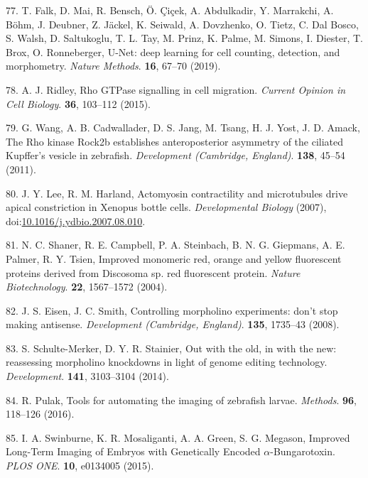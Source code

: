 \documentclass[11pt,singlespacinge,twoside]{reedthesis} %
\theoremstyle{definition}
\theoremstyle{definition}
\theoremstyle{definition}
\theoremstyle{remark}
\begin{document}
\leavevmode\hypertarget{ref-Falk2019}{}%
77. T. Falk, D. Mai, R. Bensch, Ö. Çiçek, A. Abdulkadir, Y. Marrakchi, A. Böhm, J. Deubner, Z. Jäckel, K. Seiwald, A. Dovzhenko, O. Tietz, C. Dal Bosco, S. Walsh, D. Saltukoglu, T. L. Tay, M. Prinz, K. Palme, M. Simons, I. Diester, T. Brox, O. Ronneberger, U-Net: deep learning for cell counting, detection, and morphometry. \emph{Nature Methods}. \textbf{16}, 67--70 (2019).

\leavevmode\hypertarget{ref-Ridley2015}{}%
78. A. J. Ridley, Rho GTPase signalling in cell migration. \emph{Current Opinion in Cell Biology}. \textbf{36}, 103--112 (2015).

\leavevmode\hypertarget{ref-Wang2011}{}%
79. G. Wang, A. B. Cadwallader, D. S. Jang, M. Tsang, H. J. Yost, J. D. Amack, The Rho kinase Rock2b establishes anteroposterior asymmetry of the ciliated Kupffer's vesicle in zebrafish. \emph{Development (Cambridge, England)}. \textbf{138}, 45--54 (2011).

\leavevmode\hypertarget{ref-Lee2007a}{}%
80. J. Y. Lee, R. M. Harland, Actomyosin contractility and microtubules drive apical constriction in Xenopus bottle cells. \emph{Developmental Biology} (2007), doi:\href{https://doi.org/10.1016/j.ydbio.2007.08.010}{10.1016/j.ydbio.2007.08.010}.

\leavevmode\hypertarget{ref-Shaner2004}{}%
81. N. C. Shaner, R. E. Campbell, P. A. Steinbach, B. N. G. Giepmans, A. E. Palmer, R. Y. Tsien, Improved monomeric red, orange and yellow fluorescent proteins derived from Discosoma sp. red fluorescent protein. \emph{Nature Biotechnology}. \textbf{22}, 1567--1572 (2004).

\leavevmode\hypertarget{ref-Eisen2008b}{}%
82. J. S. Eisen, J. C. Smith, Controlling morpholino experiments: don't stop making antisense. \emph{Development (Cambridge, England)}. \textbf{135}, 1735--43 (2008).

\leavevmode\hypertarget{ref-Schulte-Merker2014c}{}%
83. S. Schulte-Merker, D. Y. R. Stainier, Out with the old, in with the new: reassessing morpholino knockdowns in light of genome editing technology. \emph{Development}. \textbf{141}, 3103--3104 (2014).

\leavevmode\hypertarget{ref-Pulak2016}{}%
84. R. Pulak, Tools for automating the imaging of zebrafish larvae. \emph{Methods}. \textbf{96}, 118--126 (2016).

\leavevmode\hypertarget{ref-A.2015}{}%
85. I. A. Swinburne, K. R. Mosaliganti, A. A. Green, S. G. Megason, Improved Long-Term Imaging of Embryos with Genetically Encoded \(\alpha\)-Bungarotoxin. \emph{PLOS ONE}. \textbf{10}, e0134005 (2015).
\end{document}

